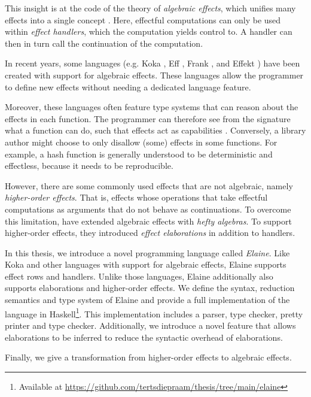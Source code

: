 This insight is at the code of the theory of \emph{algebraic effects}, which unifies many effects into a single concept \autocite{goos_adequacy_2001,castagna_handlers_2009}. Here, effectful computations can only be used within \emph{effect handlers}, which the computation yields control to. A handler can then in turn call the continuation of the computation.

In recent years, some languages (e.g. Koka \autocite{leijen_koka_2014}, Eff \autocite{bauer_programming_2015}, Frank \autocite{lindley_be_2017}, and Effekt \autocite{brachthauser_effects_2020}) have been created with support for algebraic effects. These languages allow the programmer to define new effects without needing a dedicated language feature.

Moreover, these languages often feature type systems that can reason about the effects in each function. The programmer can therefore see from the signature what a function can do, such that effects act as capabilities \autocite{brachthauser_effects_2020}. Conversely, a library author might choose to only disallow (some) effects in some functions. For example, a hash function is generally understood to be deterministic and effectless, because it needs to be reproducible.

However, there are some commonly used effects that are not algebraic, namely \emph{higher-order effects}. That is, effects whose operations that take effectful computations as arguments that do not behave as continuations. To overcome this limitation, \textcite{bach_poulsen_hefty_2023} have extended algebraic effects with \emph{hefty algebras}. To support higher-order effects, they introduced \emph{effect elaborations} in addition to handlers.

In this thesis, we introduce a novel programming language called \emph{Elaine}. Like Koka and other languages with support for algebraic effects, Elaine supports effect rows and handlers. Unlike those languages, Elaine additionally also supports elaborations and higher-order effects. We define the syntax, reduction semantics and type system of Elaine and provide a full implementation of the language in Haskell\footnote{Available at \url{https://github.com/tertsdiepraam/thesis/tree/main/elaine}}. This implementation includes a parser, type checker, pretty printer and type checker. Additionally, we introduce a novel feature that allows elaborations to be inferred to reduce the syntactic overhead of elaborations.

Finally, we give a transformation from higher-order effects to algebraic effects. 

